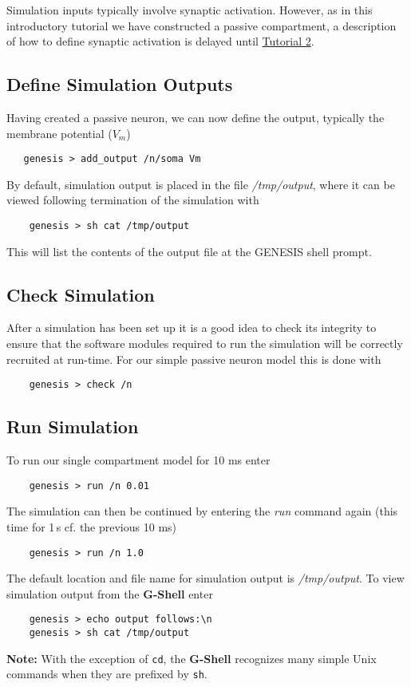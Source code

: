 \documentclass[12pt]{article}
\begin{document}
Simulation inputs typically involve synaptic activation. However, as in this introductory tutorial we have constructed a passive compartment, a description of how to define synaptic activation is delayed until \href{../tutorial2/tutorial2.tex}{Tutorial 2}.  

\subsection*{Define Simulation Outputs}

Having created a passive neuron, we can now define the output, typically the membrane potential ($V_m$)
\begin{verbatim}
   genesis > add_output /n/soma Vm
\end{verbatim}
By default, simulation output is placed in the file {\it /tmp/output}, where it can be viewed following termination of the simulation with
\begin{verbatim}
    genesis > sh cat /tmp/output
\end{verbatim}
This will list the contents of the output file at the GENESIS shell prompt.

\subsection*{Check Simulation}

After a simulation has been set up it is a good idea to check its integrity to ensure that the software modules required to run the simulation will be correctly recruited at run-time. For our simple passive neuron model this is done with 
\begin{verbatim}
    genesis > check /n
\end{verbatim}

\subsection*{Run Simulation}

To run our single compartment model for 10 ms enter
\begin{verbatim}
    genesis > run /n 0.01
\end{verbatim}
The simulation can then be continued by entering the {\it run} command again (this time for 1\,s cf. the previous 10 ms)
\begin{verbatim}
    genesis > run /n 1.0
\end{verbatim}
The default location and file name for simulation output is {\it /tmp/output}. To view simulation output from the {\bf G-Shell} enter
\begin{verbatim}
    genesis > echo output follows:\n
    genesis > sh cat /tmp/output
\end{verbatim}
{\bf Note:} With the exception of {\tt cd}, the {\bf G-Shell} recognizes many simple Unix commands when they are prefixed by {\tt sh}.
    
\end{document}
